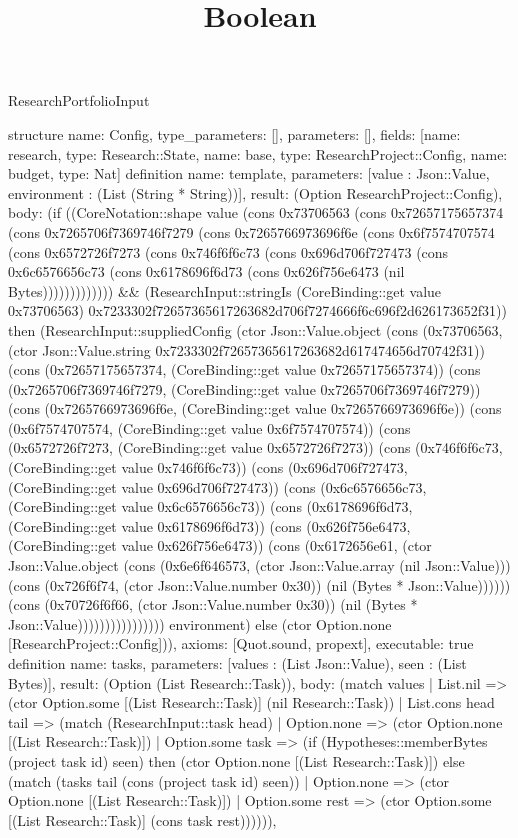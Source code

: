 \begin{lexlean}{ResearchPortfolioInput}
\title{Boolean}
\begin{semanticmodule}
structure{
 name: Config,
 type_parameters: [],
 parameters: [],
 fields: [{name: research, type: Research::State}, {name: base, type: ResearchProject::Config}, {name: budget, type: Nat}]
}
definition{
 name: template,
 parameters: [value : Json::Value, environment : (List (String * String))],
 result: (Option ResearchProject::Config),
 body: (if ((CoreNotation::shape value (cons 0x73706563 (cons 0x72657175657374 (cons 0x7265706f7369746f7279 (cons 0x7265766973696f6e (cons 0x6f7574707574 (cons 0x6572726f7273 (cons 0x746f6f6c73 (cons 0x696d706f727473 (cons 0x6c6576656c73 (cons 0x6178696f6d73 (cons 0x626f756e6473 (nil Bytes))))))))))))) && (ResearchInput::stringIs (CoreBinding::get value 0x73706563) 0x7233302f72657365617263682d706f7274666f6c696f2d626173652f31)) then (ResearchInput::suppliedConfig (ctor Json::Value.object (cons (0x73706563, (ctor Json::Value.string 0x7233302f72657365617263682d617474656d70742f31)) (cons (0x72657175657374, (CoreBinding::get value 0x72657175657374)) (cons (0x7265706f7369746f7279, (CoreBinding::get value 0x7265706f7369746f7279)) (cons (0x7265766973696f6e, (CoreBinding::get value 0x7265766973696f6e)) (cons (0x6f7574707574, (CoreBinding::get value 0x6f7574707574)) (cons (0x6572726f7273, (CoreBinding::get value 0x6572726f7273)) (cons (0x746f6f6c73, (CoreBinding::get value 0x746f6f6c73)) (cons (0x696d706f727473, (CoreBinding::get value 0x696d706f727473)) (cons (0x6c6576656c73, (CoreBinding::get value 0x6c6576656c73)) (cons (0x6178696f6d73, (CoreBinding::get value 0x6178696f6d73)) (cons (0x626f756e6473, (CoreBinding::get value 0x626f756e6473)) (cons (0x6172656e61, (ctor Json::Value.object (cons (0x6e6f646573, (ctor Json::Value.array (nil Json::Value))) (cons (0x726f6f74, (ctor Json::Value.number 0x30)) (nil (Bytes * Json::Value)))))) (cons (0x70726f6f66, (ctor Json::Value.number 0x30)) (nil (Bytes * Json::Value)))))))))))))))) environment) else (ctor Option.none [ResearchProject::Config])),
 axioms: [Quot.sound, propext],
 executable: true
}
definition{
 name: tasks,
 parameters: [values : (List Json::Value), seen : (List Bytes)],
 result: (Option (List Research::Task)),
 body: (match values | List.nil => (ctor Option.some [(List Research::Task)] (nil Research::Task)) | List.cons head tail => (match (ResearchInput::task head) | Option.none => (ctor Option.none [(List Research::Task)]) | Option.some task => (if (Hypotheses::memberBytes (project task id) seen) then (ctor Option.none [(List Research::Task)]) else (match (tasks tail (cons (project task id) seen)) | Option.none => (ctor Option.none [(List Research::Task)]) | Option.some rest => (ctor Option.some [(List Research::Task)] (cons task rest)))))),
}
\end{semanticmodule}
\end{lexlean}
